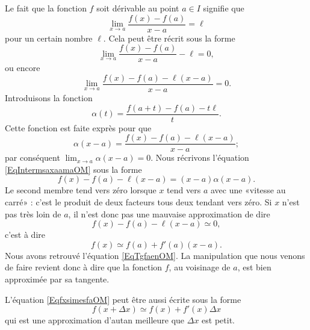 Le fait que la fonction $f$ soit dérivable au point $a\in I$ signifie que
\begin{equation}
	\lim_{x\to a} \frac{ f(x)-f(a) }{ x-a }=\ell
\end{equation}
pour un certain nombre $\ell$. Cela peut être récrit sous la forme
\begin{equation}
	\lim_{x\to a} \frac{ f(x)-f(a) }{ x-a }-\ell=0,
\end{equation}
ou encore
\begin{equation}
	\lim_{x\to a} \frac{ f(x)-f(a)-\ell(x-a) }{ x-a }=0.
\end{equation}
Introduisons la fonction
\begin{equation}
	\alpha(t)=\frac{ f(a+t)-f(a)-t\ell }{ t }.
\end{equation}
Cette fonction est faite exprès pour que
\begin{equation}		\label{EqIntermsaxaamaOM}
	\alpha(x-a)=\frac{ f(x)-f(a)-\ell(x-a) }{ x-a };
\end{equation}
par conséquent $\lim_{x\to a} \alpha(x-a)=0$. Nous récrivons l'équation \eqref{EqIntermsaxaamaOM} sous la forme
\begin{equation}        \label{EqCodeDerviffxamOM}
	f(x)-f(a)-\ell(x-a)=(x-a)\alpha(x-a).
\end{equation}
Le second membre tend vers zéro lorsque $x$ tend vers $a$ avec une «vitesse au carré» : c'est le produit de deux facteurs tous deux tendant vers zéro. Si $x$ n'est pas très loin de $a$, il n'est donc pas une mauvaise approximation de dire
\begin{equation}
	f(x)-f(a)-\ell(x-a)\simeq 0,
\end{equation}
c'est à dire
\begin{equation}		\label{EqfxsimesfaOM}
	f(x)\simeq f(a)+f'(a)(x-a).
\end{equation}
Nous avons retrouvé l'équation \eqref{EqTgfaenOM}. La manipulation que nous venons de faire revient donc à dire que la fonction $f$, au voisinage de $a$, est bien approximée par sa tangente.

L'équation \eqref{EqfxsimesfaOM} peut être aussi écrite sous la forme
\begin{equation}		\label{EqfxdxSimeqfxfpxOM}
	f(x+\Delta x)\simeq f(x)+f'(x)\Delta x
\end{equation}
qui est une approximation d'autan meilleure que $\Delta x$ est petit.

